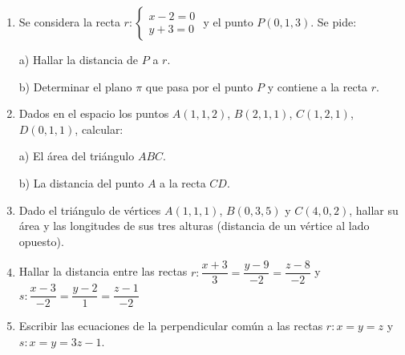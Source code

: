 \begin{enumerate}
\item Se considera la recta $r:\begin{cases}x-2=0\\y+3=0\end{cases}   $ y el punto $P(0,1,3)$. Se pide:

a) Hallar la distancia de $P$ a $r$.

b) Determinar el plano $\pi$ que pasa por el punto $P$ y contiene a la recta $r$. 

\vspace{2mm} 

\item  Dados en el espacio los puntos $A(1,1,2)$, $B(2,1,1)$, $C(1,2,1)$, $D(0,1,1)$, calcular: 

a) El área del triángulo $ABC$.

b) La distancia del punto $A$ a la recta $CD$.

\vspace{2mm} 

\item  Dado el triángulo de vértices $A(1,1,1)$, $B(0,3,5)$ y $C(4,0,2)$, hallar su área y las longitudes de sus tres alturas (distancia de un vértice al lado opuesto). 

\vspace{2mm} 

\item Hallar la distancia entre las rectas $r:\dfrac{x+3}{3}=\dfrac{y-9}{-2}=\dfrac{z-8}{-2}$ y $s:\dfrac{x-3}{-2}=\dfrac{y-2}{1}=\dfrac{z-1}{-2}$

\vspace{2mm} 

\item Escribir las ecuaciones de la perpendicular común a las rectas $r:x=y=z$ y $s:x=y=3z-1$.

\vspace{2mm} 


\end{enumerate}
